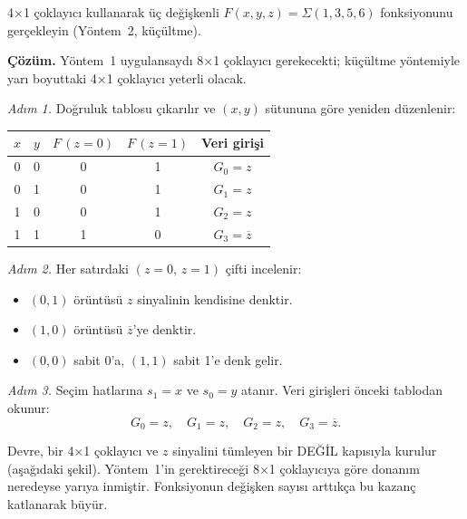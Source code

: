 \begin{ornek}[B.12]
4×1 çoklayıcı kullanarak üç değişkenli $F(x,y,z) = \Sigma(1,3,5,6)$ fonksiyonunu gerçekleyin (Yöntem~2, küçültme).

\textbf{Çözüm.}
Yöntem~1 uygulansaydı 8×1 çoklayıcı gerekecekti; küçültme yöntemiyle yarı boyuttaki 4×1 çoklayıcı yeterli olacak.

\emph{Adım 1.} Doğruluk tablosu çıkarılır ve $(x,y)$ sütununa göre yeniden düzenlenir:

\begin{center}
\renewcommand{\arraystretch}{1.15}
\begin{tabular}{cc|cc|c}
  \toprule
  $x$ & $y$ & $F\,(z{=}0)$ & $F\,(z{=}1)$ & Veri girişi \\
  \midrule
  0 & 0 & 0 & 1 & $G_0 = z$ \\
  0 & 1 & 0 & 1 & $G_1 = z$ \\
  1 & 0 & 0 & 1 & $G_2 = z$ \\
  1 & 1 & 1 & 0 & $G_3 = \overline{z}$ \\
  \bottomrule
\end{tabular}
\end{center}

\emph{Adım 2.} Her satırdaki $(z{=}0,\,z{=}1)$ çifti incelenir:
\begin{itemize}
  \item $(0, 1)$ örüntüsü $z$ sinyalinin kendisine denktir.
  \item $(1, 0)$ örüntüsü $\overline{z}$'ye denktir.
  \item $(0, 0)$ sabit 0'a, $(1, 1)$ sabit 1'e denk gelir.
\end{itemize}

\emph{Adım 3.} Seçim hatlarına $s_1 = x$ ve $s_0 = y$ atanır. Veri girişleri önceki tablodan okunur:
\[ G_0 = z,\quad G_1 = z,\quad G_2 = z,\quad G_3 = \overline{z}. \]

Devre, bir 4×1 çoklayıcı ve $z$ sinyalini tümleyen bir DEĞİL kapısıyla kurulur (aşağıdaki şekil). Yöntem~1'in gerektireceği 8×1 çoklayıcıya göre donanım neredeyse yarıya inmiştir. Fonksiyonun değişken sayısı arttıkça bu kazanç katlanarak büyür.

\begin{center}
\end{center}
\end{ornek}
